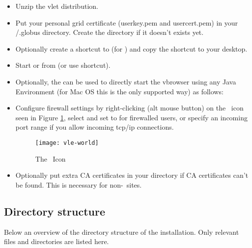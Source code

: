  \begin{itemize} 
   \item Unzip the vlet distribution. 
   \item Put your personal grid certificate (userkey.pem and usercert.pem) in
         your \HOME/.globus directory. Create the  directory if
         it doesn't exists yet. 
   \item Optionally create a shortcut to 
         (for \windows) and copy the shortcut to your desktop.
   \item Start  or  from
           (or use shortcut). 
   \item Optionally, the  can be used to directly start the
          vbrowser using any Java Environment (for Mac OS this is the only
          supported way) as follows:   
   \item Configure firewall settings by right-clicking (alt mouse button) on the 
         \myvle\ icon seen in Figure \ref{fig:myvle_icon}, select  and set  to
    for firewalled users, or specify an incoming port range if you
         allow incoming tcp/ip connections.
	  
	  \begin{figure}[htbp]
	    \centerline{\texttt{[image: vle-world]}}
	    \caption{The \myvle\ Icon}
	    \label{fig:myvle_icon}
	  \end{figure}

   \item Optionally put extra CA certificates in your  
          directory if CA certificates can't be
         found. This is necessary for non-\dutchgrid\ sites. 
 \end{itemize} 
 
\subsection{Directory structure}

Below an overview of the directory structure of the installation. Only relevant
files and directories are listed here. 

